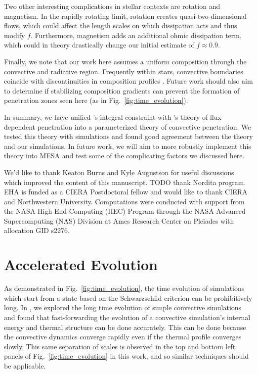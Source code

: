\documentclass{aastex631}
\begin{document}
Two other interesting complications in stellar contexts are rotation and magnetism.
In the rapidly rotating limit, rotation creates quasi-two-dimensional flows, which could affect the length scales on which dissipation acts and thus modify $f$.
Furthermore, magnetism adds an additional ohmic dissipation term, which could in theory drastically change our initial estimate of $f \approx 0.9$.

Finally, we note that our work here assumes a uniform composition through the convective and radiative region.
Frequently within stars, convective boundaries coincide with discontinuities in composition profiles \citep{salaris_cassisi_2017}.
Future work should also aim to determine if stabilizing composition gradients can prevent the formation of penetration zones seen here (as in Fig.~\ref{fig:time_evolution}).

In summary, we have unified \citet{roxburgh1989}'s integral constraint with \citet{zahn1991}'s theory of flux-dependent penetration into a parameterized theory of convective penetration.
We tested this theory with simulations and found good agreement between the theory and our simulations.
In future work, we will aim to more robustly implement this theory into MESA and test some of the complicating factors we discussed here.





\begin{acknowledgments}
We'd like to thank Keaton Burns and Kyle Augustson for useful discussions which improved the content of this manuscript.
TODO thank Nordita program.
EHA is funded as a CIERA Postdoctoral fellow and would like to thank CIERA and Northwestern University. 
Computations were conducted with support from the NASA High End Computing (HEC) Program through the NASA Advanced Supercomputing (NAS) Division at Ames Research Center on Pleiades with allocation GID s2276.
\end{acknowledgments}


\appendix

\section{Accelerated Evolution}
\label{app:accelerated_evolution}
As demonstrated in Fig.~\ref{fig:time_evolution}, the time evolution of simulations which start from a state based on the Schwarzschild criterion can be prohibitively long.
In \citet{anders_etal_2018}, we explored the long time evolution of simple convective simulations and found that fast-forwarding the evolution of a convective simulation's internal energy and thermal structure can be done accurately.
This can be done because the convective dynamics converge rapidly even if the thermal profile converges slowly.
This same separation of scales is observed in the top and bottom left panels of Fig.~\ref{fig:time_evolution} in this work, and so similar techniques should be applicable.
\end{document}
